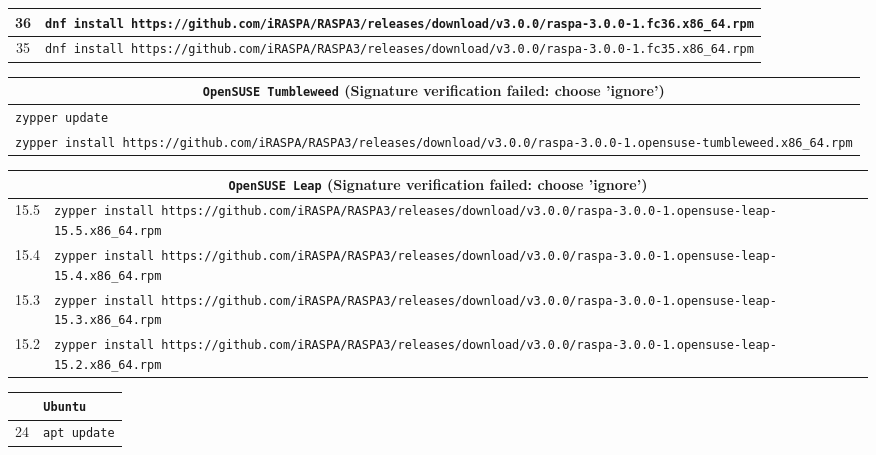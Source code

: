 \begin{table}[p]
\begin{tabularx}{\linewidth}{c|X}
     \hline
  36 & \verb+dnf install https://github.com/iRASPA/RASPA3/releases/download/v3.0.0/raspa-3.0.0-1.fc36.x86_64.rpm+\\
     \hline
  35 & \verb+dnf install https://github.com/iRASPA/RASPA3/releases/download/v3.0.0/raspa-3.0.0-1.fc35.x86_64.rpm+\\
  \end{tabularx}
  \newline
\vspace*{0.5 cm}
\newline
  \begin{tabularx}{\linewidth}{X}
    \multicolumn{1}{c}{\texttt{OpenSUSE Tumbleweed} (Signature verification failed: choose 'ignore')}\\
   \hline
    \verb+zypper update+\\
    \verb+zypper install https://github.com/iRASPA/RASPA3/releases/download/v3.0.0/raspa-3.0.0-1.opensuse-tumbleweed.x86_64.rpm+\\
  \end{tabularx}
  \newline
\vspace*{0.5 cm}
\newline
  \begin{tabularx}{\linewidth}{c|X}
    \multicolumn{2}{c}{\texttt{OpenSUSE Leap} (Signature verification failed: choose 'ignore')}\\
   \hline
  15.5 & \verb+zypper install https://github.com/iRASPA/RASPA3/releases/download/v3.0.0/raspa-3.0.0-1.opensuse-leap-15.5.x86_64.rpm+\\
     \hline
  15.4 & \verb+zypper install https://github.com/iRASPA/RASPA3/releases/download/v3.0.0/raspa-3.0.0-1.opensuse-leap-15.4.x86_64.rpm+\\
     \hline
  15.3 & \verb+zypper install https://github.com/iRASPA/RASPA3/releases/download/v3.0.0/raspa-3.0.0-1.opensuse-leap-15.3.x86_64.rpm+\\
     \hline
  15.2 & \verb+zypper install https://github.com/iRASPA/RASPA3/releases/download/v3.0.0/raspa-3.0.0-1.opensuse-leap-15.2.x86_64.rpm+\\
  \end{tabularx}
  \newline
\vspace*{0.5 cm}
\newline
  \begin{tabularx}{\linewidth}{c|X}
    \multicolumn{2}{c}{\texttt{Ubuntu}}\\
   \hline
  24 & \verb+apt update+\\

\end{tabularx}
\end{table}
